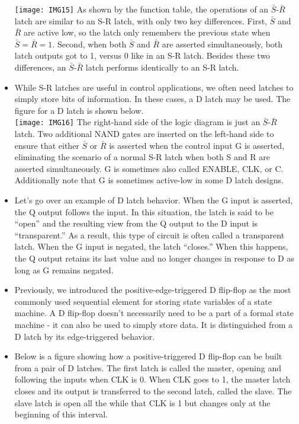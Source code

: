 \documentclass[10pt,a4paper]{article}
\begin{document}
\begin{itemize}
\texttt{[image: IMG15]}
As shown by the function table, the operations of an $\bar{S}$-$\bar{R}$ latch are similar to an S-R latch, with only two key differences. First, $\bar{S}$ and $\bar{R}$ are active low, so the latch only remembers the previous state when $\bar{S}=\bar{R}=1$. Second, when both $\bar{S}$ and $\bar{R}$ are asserted simultaneously, both latch outputs got to 1, versus 0 like in an S-R latch. Besides these two differences, an $\bar{S}$-$\bar{R}$ latch performs identically to an S-R latch.
\item While S-R latches are useful in control applications, we often need latches to simply store bits of information. In these cases, a D latch may be used. The figure for a D latch is shown below.\\
\texttt{[image: IMG16]}
The right-hand side of the logic diagram is just an $\bar{S}$-$\bar{R}$ latch. Two additional NAND gates are inserted on the left-hand side to ensure that either $\bar{S}$ or $\bar{R}$ is asserted when the control input G is asserted, eliminating the scenario of a normal S-R latch when both S and R are asserted simultaneously. G is sometimes also called ENABLE, CLK, or C. Additionally note that G is sometimes active-low in some D latch designs. 
\item Let's go over an example of D latch behavior. When the G input is asserted, the Q output follows the input. In this situation, the latch is said to be ``open'' and the resulting view from the Q output to the D input is ``transparent.'' As a result, this type of circuit is often called a transparent latch. When the G input is negated, the latch ``closes.'' When this happens, the Q output retains its last value and no longer changes in response to D as long as G remains negated. 
\item Previously, we introduced the positive-edge-triggered D flip-flop as the most commonly used sequential element for storing state variables of a state machine. A D flip-flop doesn't necessarily need to be a part of a formal state machine - it can also be used to simply store data. It is distinguished from a D latch by its edge-triggered behavior. 
\item Below is a figure showing how a positive-triggered D flip-flop can be built from a pair of D latches. The first latch is called the master, opening and following the inputs when CLK is 0. When CLK goes to 1, the master latch closes and its output is transferred to the second latch, called the slave. The slave latch is open all the while that CLK is 1 but changes only at the beginning of this interval.\\

\end{itemize}
\end{document}
